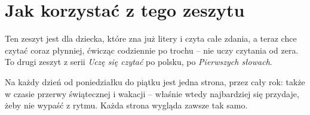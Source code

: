 \section*{Jak korzystać z tego zeszytu}

Ten zeszyt jest dla dziecka, które zna już litery i czyta całe zdania, a
teraz chce czytać coraz płynniej, ćwicząc codziennie po trochu -- nie
uczy czytania od zera. To drugi zeszyt z serii \emph{Uczę się czytać}
po polsku, po \emph{Pierwszych słowach}.

Na każdy dzień od poniedziałku do piątku jest jedna strona, przez cały
rok: także w czasie przerwy świątecznej i wakacji -- właśnie wtedy
najbardziej się przydaje, żeby nie wypaść z rytmu. Każda strona wygląda
zawsze tak samo.

